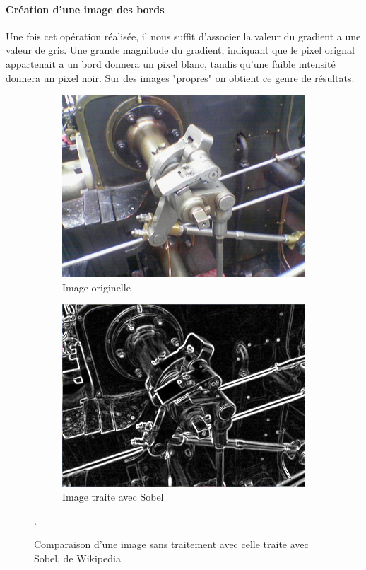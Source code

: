 \documentclass[a4paper, 12pt, titlepage, oneside, french]{article}
\begin{document}
	\paragraph{\textbf{Création d'une image des bords}}
	Une fois cet opération réalisée, il nous suffit d'associer la valeur du gradient a une valeur de gris. Une grande magnitude du gradient, indiquant que le pixel orignal appartenait a un bord donnera un pixel blanc, tandis qu'une faible intensité donnera un pixel noir.
	Sur des images "propres" on obtient ce genre de résultats: \\
	\begin{figure}[]
		\centering
		\begin{subfigure}[b]{0.4\linewidth}
			\includegraphics[width=\linewidth]{ValveOriginal.png}
			\caption{Image originelle}
		\end{subfigure}
		\begin{subfigure}[b]{0.4\linewidth}
			\includegraphics[width=\linewidth]{ValveSobel.png}
			\caption{Image traite avec Sobel}
		\end{subfigure}
		\caption{Comparaison d'une image sans traitement avec celle traite avec Sobel, de Wikipedia \cite{WikiCannyOriginal}\cite{WikiSobel}}. 
		\label{fig:SobelGood}
	\end{figure}
\end{document}
